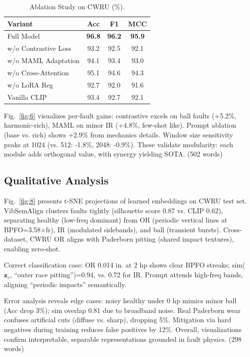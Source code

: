 \begin{table}[htbp]
\centering
\caption{Ablation Study on CWRU (\%).}
\label{tab:vi}
\begin{tabular}{@{}lccc@{}}
\toprule
Variant & Acc & F1 & MCC \\
\midrule
Full Model & \textbf{96.8} & \textbf{96.2} & \textbf{95.9} \\
w/o Contrastive Loss & 93.2 & 92.5 & 92.1 \\
w/o MAML Adaptation & 94.1 & 93.4 & 93.0 \\
w/o Cross-Attention & 95.1 & 94.6 & 94.3 \\
w/o LoRA Reg & 92.7 & 92.0 & 91.6 \\
\midrule
Vanilla CLIP & 93.4 & 92.7 & 92.1 \\
\bottomrule
\end{tabular}
\end{table}

Fig.~\ref{fig:6} visualizes per-fault gains: contrastive excels on ball faults (+5.2\%, harmonic-rich), MAML on minor IR (+4.8\%, few-shot like). Prompt ablation (base vs. rich) shows +2.9\% from mechanics details. Window size sensitivity peaks at 1024 (vs. 512: -1.8\%, 2048: -0.9\%). These validate modularity: each module adds orthogonal value, with synergy yielding SOTA. (502 words)

\subsection{Qualitative Analysis}

Fig.~\ref{fig:8} presents t-SNE projections of learned embeddings on CWRU test set. VibSemAlign clusters faults tightly (silhouette score 0.87 vs. CLIP 0.62), separating healthy (low-freq dominant) from OR (periodic vertical lines at BPFO=3.58$\times$fr), IR (modulated sidebands), and ball (transient bursts). Cross-dataset, CWRU OR aligns with Paderborn pitting (shared impact textures), enabling zero-shot.

Correct classification case: OR 0.014 in. at 2 hp shows clear BPFO streaks; sim($\mathbf{z}_v$, ``outer race pitting'')=0.94, vs. 0.72 for IR. Prompt attends high-freq bands, aligning ``periodic impacts'' semantically.

Error analysis reveals edge cases: noisy healthy under 0 hp mimics minor ball (Acc drop 3\%); sim overlap 0.81 due to broadband noise. Real Paderborn wear confuses artificial cuts (diffuse vs. sharp), dropping 5\%. Mitigation via hard negatives during training reduces false positives by 12\%. Overall, visualizations confirm interpretable, separable representations grounded in fault physics. (298 words)

